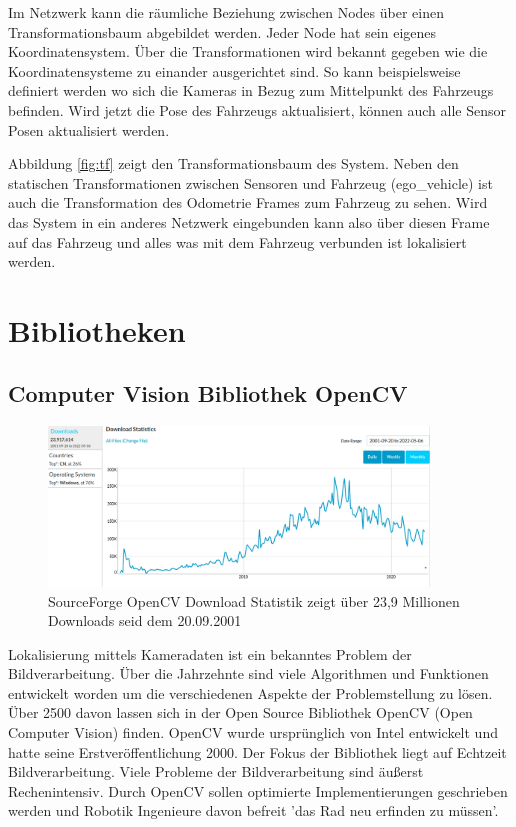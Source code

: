 Im Netzwerk kann die räumliche Beziehung zwischen Nodes über einen Transformationsbaum abgebildet werden. Jeder Node hat sein eigenes Koordinatensystem. Über die Transformationen wird bekannt gegeben wie die Koordinatensysteme zu einander ausgerichtet sind. So kann beispielsweise definiert werden wo sich die Kameras in Bezug zum Mittelpunkt des Fahrzeugs befinden. Wird jetzt die Pose des Fahrzeugs aktualisiert, können auch alle Sensor Posen aktualisiert werden. 

Abbildung \ref{fig:tf} zeigt den Transformationsbaum des System. Neben den statischen Transformationen zwischen Sensoren und Fahrzeug (ego\_vehicle) ist auch die Transformation des Odometrie Frames zum Fahrzeug zu sehen. Wird das System in ein anderes Netzwerk eingebunden kann also über diesen Frame auf das Fahrzeug und alles was mit dem Fahrzeug verbunden ist lokalisiert werden.

\pagebreak
\section{Bibliotheken}

\subsection{Computer Vision Bibliothek OpenCV}

\begin{figure}[!h]
  \includegraphics[width=0.9\textwidth]{pictures/06_cv_downloadstatistics.png}
  \caption[OpenCV Bibliothek Download Statistik]{SourceForge OpenCV Download Statistik zeigt über 23,9 Millionen Downloads seid dem 20.09.2001}
\end{figure}

Lokalisierung mittels Kameradaten ist ein bekanntes Problem der Bildverarbeitung. Über die Jahrzehnte sind viele Algorithmen und Funktionen entwickelt worden um die verschiedenen Aspekte der Problemstellung zu lösen. Über 2500 davon lassen sich in der Open Source Bibliothek OpenCV (Open Computer Vision) finden. OpenCV wurde ursprünglich von Intel entwickelt und hatte seine Erstveröffentlichung 2000. Der Fokus der Bibliothek liegt auf Echtzeit Bildverarbeitung. Viele Probleme der Bildverarbeitung sind äu{\ss}erst Rechenintensiv. Durch OpenCV sollen optimierte Implementierungen geschrieben werden und Robotik Ingenieure davon befreit 'das Rad neu erfinden zu müssen'.
\newline

